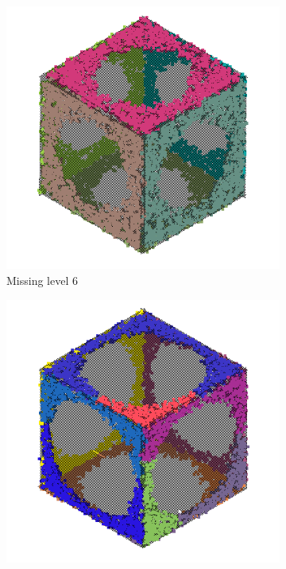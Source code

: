 \begin{figure}[ht!]
    \begin{subfigure}[b]{0.25\textwidth}
        \centering
        \includegraphics[width=0.9\linewidth]{python/plots/cube_points/data/matrix/cube_points_m6_n01_primitives}
        \caption{Missing level 6}
    \end{subfigure}%
    \begin{subfigure}[b]{0.25\textwidth}
        \centering
        \includegraphics[width=0.9\linewidth]{python/plots/cube_points/data/matrix/cube_points_m12_n01_primitives}

\end{subfigure}
\end{figure}
